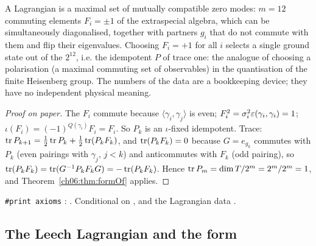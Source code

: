 \begin{physics}
A Lagrangian is a maximal set of mutually compatible zero modes: $m=12$ commuting elements $F_i=\pm1$ of the extraspecial algebra, which can be simultaneously diagonalised, together with partners $g_i$ that do not commute with them and flip their eigenvalues. Choosing $F_i=+1$ for all $i$ selects a single ground state out of the $2^{12}$, i.e. the idempotent $P$ of trace one: the analogue of choosing a polarisation (a maximal commuting set of observables) in the quantisation of the finite Heisenberg group. The numbers of the data are a bookkeeping device; they have no independent physical meaning.
\end{physics}
\begin{proof}[Proof on paper]
The $F_i$ commute because $\langle\gamma_i,\gamma_j\rangle$ is even; $F_i^2=\sigma_i^2
\varepsilon(\gamma_i,\gamma_i)=1$; $\iota(F_i)=(-1)^{Q(\gamma_i)}F_i=F_i$.  So $P_k$ is an
$\iota$-fixed idempotent.  Trace: $\operatorname{tr} P_{k+1}=\frac12\operatorname{tr} P_k+\frac12\operatorname{tr}(P_kF_k)$, and
$\operatorname{tr}(P_kF_k)=0$ because $G=e_{g_k}$ commutes with $P_k$ (even pairings with $\gamma_j$, $j<k$) and
anticommutes with $F_k$ (odd pairing), so
$\operatorname{tr}(P_kF_k)=\operatorname{tr}(G^{-1}P_kF_kG)=-\operatorname{tr}(P_kF_k)$.  Hence $\operatorname{tr} P_m=\dim T/2^m=2^m/2^m=1$, and
Theorem~\ref{ch06:thm:formOf} applies.
\end{proof}
\begin{status}
\texttt{\#print axioms} : .  Conditional on ,  and the Lagrangian data .
\end{status}

\subsection{The Leech Lagrangian and the form \texorpdfstring{}{TForm}}


